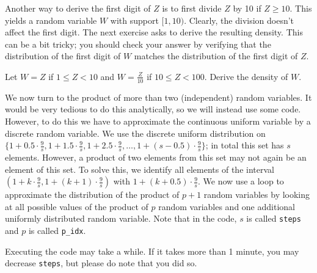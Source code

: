 \documentclass[assignments]{subfiles}
\begin{document}
Another way to derive the first digit of $Z$ is to first divide $Z$ by 10 if $Z \geq 10$. This yields a random variable $W$ with support $[1, 10)$. Clearly, the division doesn't affect the first digit.  The next exercise asks to derive the resulting density. This can be a bit tricky; you should check your answer by verifying that the distribution of the first digit of $W$ matches the distribution of the first digit of $Z$.

\begin{exercise}
Let $W = Z$ if $1 \leq Z < 10$ and $W = \tfrac{Z}{10}$ if $10 \leq Z < 100$. Derive the density of $W$.

\end{exercise}


We now turn to the product of more than two (independent) random variables. It would be very tedious to do this analytically, so we will instead use some code. However, to do this we have to approximate the continuous uniform variable by a discrete random variable. We use the discrete uniform distribution on $\{1+ 0.5 \cdot \frac{9}{s}, 1 + 1.5 \cdot \frac{9}{s}, 1 + 2.5 \cdot \frac{9}{s}, \ldots, 1 + (s-0.5) \cdot \frac{9}{s}\}$; in total this set has $s$ elements. However, a product of two elements from this set may not again be an element of this set. To solve this, we identify all elements of the interval $\left(1+ k \cdot \frac{9}{s}, 1+ (k+1)\cdot \frac{9}{s}\right)$ with $1+ (k+0.5)\cdot \frac{9}{s}$. We now use a loop to approximate the distribution of the product of $p+1$ random variables by looking at  all possible values of the product of $p$ random variables and one additional uniformly distributed random variable. Note that in the code, $s$ is called \texttt{steps} and $p$ is  called \verb|p_idx|.

Executing the code may take a while. If it takes more than 1 minute, you may decrease \texttt{steps}, but please do note that you did so.
\end{document}

